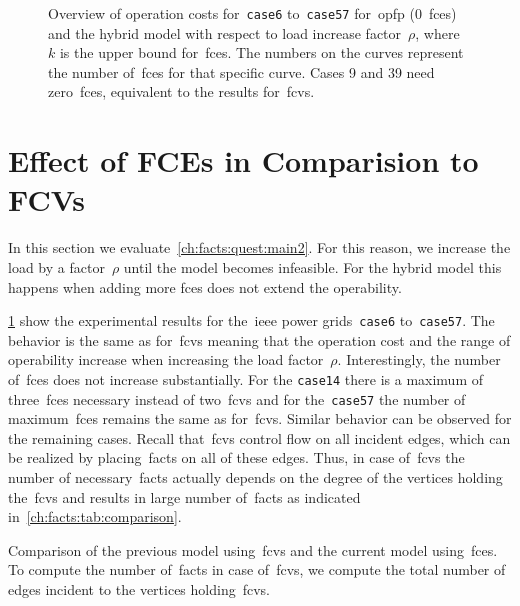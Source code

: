\begin{figure}[tbp!]
\begin{subfigure}[t]{.492\textwidth}
    \end{subfigure}
    \caption[Overview of operation costs while placing~\gls{facts}.]
    {Overview of operation costs for~\texttt{case6} to~\texttt{case57}
    for~\gls{opfp} ($0$~\gls{fce}s) and the hybrid model with respect
    to load increase factor~$\rho$, where~$k$ is the upper bound
    for~\gls{fce}s. The numbers on the curves represent the number
    of~\gls{fce}s for that specific curve. Cases 9 and 39 need
    zero~\gls{fce}s, equivalent to the results for~\gls{fcv}s.}
    \label{ch:facts:figure:appendix}
\end{figure}
%
\section{Effect of FCEs in Comparision to FCVs}
\label{ch:facts-branches:sec:effect-of-fcls-in-comparison-to-FCBs}
%
In this section we evaluate~\cref{ch:facts:quest:main2}. For this reason, we
increase the load by a factor~$\rho$ until the model becomes infeasible. For the
hybrid model this happens when adding more \gls{fce}s does not extend the
operability.

\cref{ch:facts:figure:appendix} show the experimental results for the~\gls{ieee}
power grids~\texttt{case6} to~\texttt{case57}. The behavior is the same as
for~\gls{fcv}s meaning that the operation cost and the range of operability
increase when increasing the load factor~$\rho$. Interestingly, the number
of~\gls{fce}s does not increase substantially. For the \texttt{case14} there is
a maximum of three~\gls{fce}s necessary instead of two~\gls{fcv}s and for
the~\texttt{case57} the number of maximum~\gls{fce}s remains the same as
for~\gls{fcv}s. Similar behavior can be observed for the remaining cases. Recall
that~\gls{fcv}s control flow on all incident edges, which can be realized by
placing~\gls{facts} on all of these edges. Thus, in case of~\gls{fcv}s the
number of necessary~\gls{facts} actually depends on the degree of the vertices
holding the~\gls{fcv}s and results in large number of~\gls{facts} as indicated
in~\cref{ch:facts:tab:comparison}.
%
\begin{table}[tb!]
    \centering
    \caption[Comparison of the~\gls{fcv} and~\gls{fce} Model.]
    {Comparison of the previous model using~\gls{fcv}s and the current model
    using~\gls{fce}s. To compute the number of~\gls{facts} in case
    of~\gls{fcv}s, we compute the total number of edges incident to the vertices
    holding~\gls{fcv}s.}
    \label{ch:facts:tab:comparison}
    
\end{table}
%
